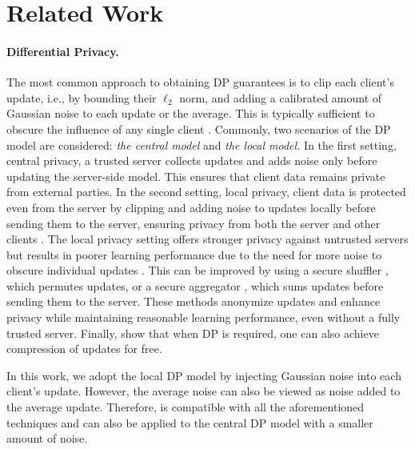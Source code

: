 \section{Related Work}
\paragraph{Differential Privacy.} The most common approach to obtaining DP guarantees is to clip each client's update, i.e., by bounding their $\ell_2$ norm, and adding a calibrated amount of Gaussian noise to each update or the average. This is typically sufficient to obscure the influence of any single client \citep{mcmahan2017learning}. Commonly, two scenarios of the DP model are considered: \textit{the central model} and \textit{the local model.} In the first setting, central privacy, a trusted server collects updates and adds noise only before updating the server-side model. This ensures that client data remains private from external parties. In the second setting, local privacy, client data is protected even from the server by clipping and adding noise to updates locally before sending them to the server, ensuring privacy from both the server and other clients \citep{kasiviswanathan2011can, allouah2024privacy}. The local privacy setting offers stronger privacy against untrusted servers but results in poorer learning performance due to the need for more noise to obscure individual updates \citep{chan2012optimal, duchi2018minimax}. This can be improved by using a secure shuffler \citep{erlingsson2019amplification, balle2019privacy}, which permutes updates, or a secure aggregator \citep{bonawitz2017practical}, which sums updates before sending them to the server. These methods anonymize updates and enhance privacy while maintaining reasonable learning performance, even without a fully trusted server. Finally, \citep{chaudhuri2022privacy, hegazy2024compression} show that when DP is required, one can also achieve compression of updates for free.

In this work, we adopt the local DP model by injecting Gaussian noise into each client's update. However, the average noise can also be viewed as noise added to the average update. Therefore,  is compatible with all the aforementioned techniques and can also be applied to the central DP model with a smaller amount of noise.





